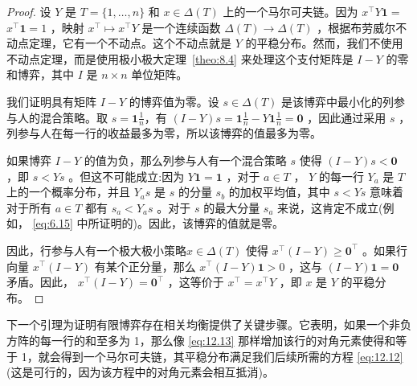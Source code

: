 \begin{proof}
设 \(Y\) 是 \(T = \{ 1,\ldots ,n\}\) 和 \(x \in  \Delta \left( T\right)\) 上的一个马尔可夫链。因为 \({x}^{\top }Y\bm{1} =\)  \({x}^{\top }\bm{1} = 1\) ，映射 \({x}^{\top } \mapsto  {x}^{\top }Y\) 是一个连续函数 \(\Delta \left( T\right)  \rightarrow  \Delta \left( T\right)\) ，根据布劳威尔不动点定理，它有一个不动点。这个不动点就是 \(Y\) 的平稳分布。然而，我们不使用不动点定理，而是使用极小极大定理~\ref{theo:8.4} 来处理这个支付矩阵是 \(I - Y\) 的零和博弈，其中 \(I\) 是 \(n \times  n\) 单位矩阵。

我们证明具有矩阵 \(I - Y\) 的博弈值为零。设 \(s \in  \Delta \left( T\right)\) 是该博弈中最小化的列参与人的混合策略。取 \(s = \bm{1}\frac{1}{n}\)，有 \(\left( {I - Y}\right) s = \bm{1}\frac{1}{n} - Y\bm{1}\frac{1}{n} = \bm{0}\) ，因此通过采用 \(s\) ，列参与人在每一行的收益最多为零，所以该博弈的值最多为零。


如果博弈 \(I - Y\) 的值为负，那么列参与人有一个混合策略 \(s\) 使得 \(\left( {I - Y}\right) s < \bm{0}\) ，即 \(s < {Ys}\) 。但这不可能成立:因为 \(Y\bm{1} = \bm{1}\) ，对于 \(a \in  T\) ， \(Y\) 的每一行 \({Y}_{a}\) 是 \(T\) 上的一个概率分布，并且 \({Y}_{a}s\) 是 \(s\) 的分量 \({s}_{b}\) 的加权平均值，其中 \(s < {Ys}\) 意味着对于所有 \(a \in  T\) 都有 \({s}_{a} < {Y}_{a}s\) 。对于 \(s\) 的最大分量 \({s}_{a}\) 来说，这肯定不成立(例如， \eqref{eq:6.15} 中所证明的)。因此，该博弈的值就是零。

因此，行参与人有一个极大极小策略\(x \in  \Delta \left( T\right)\) 使得 \({x}^{\top }\left( {I - Y}\right)  \geq  {\bm{0}}^{\top }\) 。如果行向量 \({x}^{\top }\left( {I - Y}\right)\) 有某个正分量，那么 \({x}^{\top }\left( {I - Y}\right) \bm{1} > 0\) ，这与 \(\left( {I - Y}\right) \bm{1} = \bm{0}\) 矛盾。因此， \({x}^{\top }\left( {I - Y}\right)  = {\bm{0}}^{\top }\) ，这等价于 \({x}^{\top } = {x}^{\top }Y\) ，即 \(x\) 是 \(Y\) 的平稳分布。
\end{proof}

下一个引理为证明有限博弈存在相关均衡提供了关键步骤。它表明，如果一个非负方阵的每一行的和至多为 1，那么像 \eqref{eq:12.13} 那样增加该行的对角元素使得和等于 1，就会得到一个马尔可夫链，其平稳分布满足我们后续所需的方程 \eqref{eq:12.12}(这是可行的，因为该方程中的对角元素会相互抵消)。

